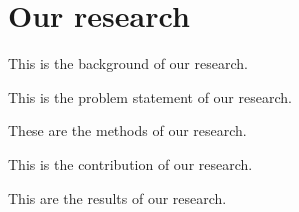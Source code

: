 \documentclass{article}
\begin{document}
\section{Our research}


\begin{background}
    This is the background of our research.
\end{background}
\begin{problem statement}
    This is the problem statement of our research.
\end{problem statement}
\begin{methods}
    These are the methods of our research.
\end{methods}
\begin{contribution}
    This is the contribution of our research.
\end{contribution}
\begin{results}
    This are the results of our research.
\end{results}
\end{document}
